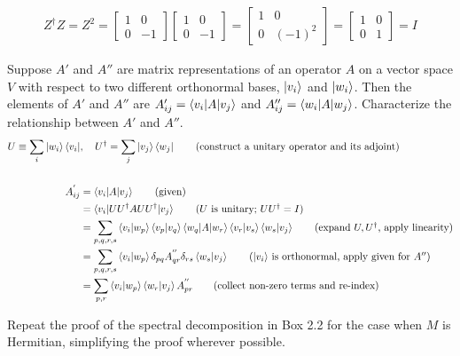 \begin{align*}
	Z^\dagger Z = Z^2 = \begin{bmatrix}
		1 & 0 \\
		0 & -1
	\end{bmatrix}
	\begin{bmatrix}
		1 & 0 \\
		0 & -1
	\end{bmatrix}
	= \begin{bmatrix}
		1 & 0 \\
		0 & (-1)^2
	\end{bmatrix}
	= \begin{bmatrix}
		1 & 0 \\
		0 & 1
	\end{bmatrix} = I
\end{align*}

 Suppose $A'$ and $A''$ are matrix representations of an operator $A$ on a vector space $V$ with respect to two different orthonormal bases, $\ket{v_i}$ and $\ket{w_i}$.  Then the elements of $A'$ and $A''$ are $A'_{ij} = \braket{v_i | A | v_j}$ and $A''_{ij} = \braket{w_i | A | w_j}$.  Characterize the relationship between $A'$ and $A''$.
\Soln
\begin{align*}
	U \equiv \sum_i \ket{w_i}\bra{v_i}&,\ \  \ U^\dagger=\sum_j \ket{v_j}\bra{w_j} \tag{construct a unitary operator and its adjoint}\\
	\\
	A_{ij}^{'} &= \braket{v_i | A | v_j} \tag{given} \\
	&= \braket{v_i | UU^\dagger A UU^\dagger | v_j} \tag{$U$ is unitary; $UU^\dagger=I$} \\
	&= \sum_{p,q,r,s} \braket{v_i | w_p} \braket{v_p | v_q} \braket{w_q | A | w_r} \braket{v_r | v_s} \braket{w_s | v_j} \tag{expand $U,U^\dagger$, apply linearity}\\
	&= \sum_{p,q,r,s} \braket{v_i | w_p} \delta_{pq} A_{qr}^{''} \delta_{rs}  \braket{w_s | v_j} \tag{$\ket{v_i}$ is orthonormal, apply given for $A''$}\\
	&= \sum_{p,r}  \braket{v_i | w_p}  \braket{w_r | v_j} A_{pr}^{''} \tag{collect non-zero terms and re-index}
\end{align*}

 Repeat the proof of the spectral decomposition in Box 2.2 for the case when $M$ is Hermitian, simplifying the proof wherever possible.


